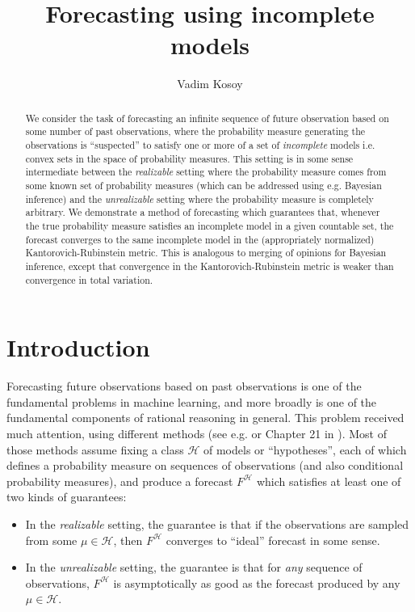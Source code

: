 \documentclass[11pt]{article}
\theoremstyle{definition}
\theoremstyle{plain}
\newcommand{\MC}{\mathcal{H}}
\begin{document}
\title{Forecasting using incomplete models}
\author{Vadim Kosoy}
\date{}%
\maketitle

\begin{abstract}
We consider the task of forecasting an infinite sequence of future observation based on some number of past observations, where the probability measure generating the observations is \enquote{suspected} to satisfy one or more of a set of \emph{incomplete} models i.e. convex sets in the space of probability measures. This setting is in some sense intermediate between the \emph{realizable} setting where the probability measure comes from some known set of probability measures (which can be addressed using e.g. Bayesian inference) and the \emph{unrealizable} setting where the probability measure is completely arbitrary. We demonstrate a method of forecasting which guarantees that, whenever the true probability measure satisfies an incomplete model in a given countable set, the forecast converges to the same incomplete model in the (appropriately normalized) Kantorovich-Rubinstein metric. This is analogous to merging of opinions for Bayesian inference, except that convergence in the  Kantorovich-Rubinstein metric is weaker than convergence in total variation.
\end{abstract}


\section{Introduction}

Forecasting future observations based on past observations is one of the fundamental problems in machine learning, and more broadly is one of the fundamental components of rational reasoning in general. This problem received much attention, using different methods (see e.g. \cite{Cesa-Bianchi_2006} or Chapter 21 in \cite{Shalev-Shwartz_2014}). Most of those methods assume fixing a class $\MC$ of models or \enquote{hypotheses}, each of which defines a probability measure on sequences of observations (and also conditional probability measures), and produce a forecast $F^\MC$ which satisfies at least one of two kinds of guarantees:

\begin{itemize}
\item 
In the \emph{realizable} setting, the guarantee is that if the observations are sampled from some $\mu \in \MC$, then $F^\MC$ converges to \enquote{ideal} forecast in some sense.
\item
In the \emph{unrealizable} setting, the guarantee is that for \emph{any} sequence of observations, $F^\MC$ is asymptotically as good as the forecast produced by any $\mu \in \MC$.
\end{itemize}
\end{document}
